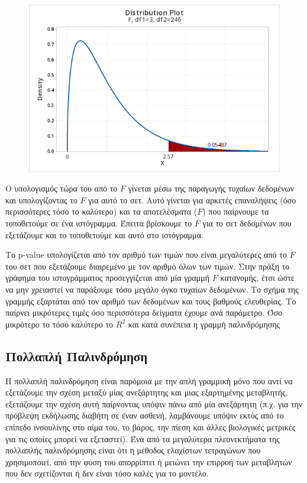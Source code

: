 \begin{figure}[H]
    \centering
    \includegraphics[width=1\textwidth]{images/F - pvalue.png}
    \caption{}
\end{figure}

Ο υπολογισμός τώρα του  από το $F$ γίνεται μέσω της παραγωγής τυχαίων δεδομένων
και υπολογίζοντας το $F$ για αυτό το σετ. Αυτό γίνεται για αρκετές επαναλήψεις (όσο
περισσότερες τόσο το καλύτερο) και τα αποτελέσματα ($F$) που παίρνουμε τα τοποθετούμε σε
ένα ιστόγραμμα. Έπειτα βρίσκουμε το $F$ για το σετ δεδομένων που εξετάζουμε και το
τοποθετούμε και αυτό στο ιστόγραμμα.

Το p-value υπολογίζεται από τον αριθμό των τιμών
που είναι μεγαλύτερες από το $F$ του σετ που εξετάζουμε διαιρεμένο με τον αριθμό όλων των
τιμών. Στην πράξη το γράφημα του ιστογράμματος προσεγγίζεται από μία γραμμή $F$
κατανομής, έτσι ώστε να μην χρειαστεί να παράξουμε τόσο μεγάλο όγκο τυχαίων δεδομένων.
Το σχήμα της γραμμής εξαρτάται από τον αριθμό των δεδομένων και τους βαθμούς
ελευθερίας. Το  παίρνει μικρότερες τιμές όσο περισσότερα δείγματα έχουμε ανά
παράμετρο. Όσο μικρότερο το  τόσο καλύτερο το $R^2$
και κατά συνέπεια η γραμμή
παλινδρόμησης
\subsection{Πολλαπλή Παλινδρόμηση}
Η πολλαπλή παλινδρόμηση είναι παρόμοια με την απλή γραμμική μόνο που αντί να
εξετάζουμε την σχέση μεταξύ μίας ανεξάρτητης και μιας εξαρτημένης μεταβλητής,
εξετάζουμε την σχέση αυτή παίρνοντας υπόψιν πάνω από μία ανεξάρτητη (π.χ. για την
πρόβλεψη εκδήλωσης διαβήτη σε έναν ασθενή, λαμβάνουμε υπόψιν εκτός από το επίπεδο
ινσουλίνης στο αίμα του, το βάρος, την πίεση και άλλες βιολογικές μετρικές για τις οποίες
μπορεί να εξεταστεί). Ένα από τα μεγαλύτερα πλεονεκτήματα της πολλαπλής παλινδρόμησης
είναι ότι η μέθοδος ελαχίστων τετραγώνων που χρησιμοποιεί, από την φύση του απορρίπτει
ή μειώνει την επιρροή των μεταβλητών που δεν σχετίζονται ή δεν είναι τόσο καλές για το
μοντέλο.

